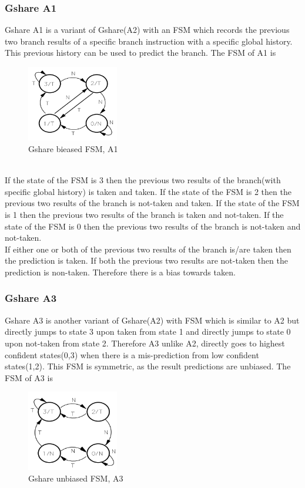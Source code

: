 \documentclass[a4paper]{article}
\begin{document}
        \subsubsection{Gshare A1}
            Gshare A1 is a variant of Gshare(A2) with an FSM which records the previous two branch results of a specific branch instruction with a specific global history. This previous history can be used to predict the branch. The FSM of A1 is \\
            \begin{figure}[ht]
                \centerline{\includegraphics[width= 4cm]{images/veerendra/gshare_a1.png}}
                \caption{Gshare bieased FSM, A1}
                \label{fig_gshare_a1}
            \end{figure}
            \\
            If the state of the FSM is 3 then the previous two results of the branch(with specific global history) is taken and taken. If the state of the FSM is 2 then the previous two results of the branch is not-taken and taken. If the state of the FSM is 1 then the previous two results of the branch is taken and not-taken. If the state of the FSM is 0 then the previous two results of the branch is not-taken and not-taken.\\
            If either one or both of the previous two results of the branch is/are taken then the prediction is taken. If both the previous two results are not-taken then the prediction is non-taken. Therefore there is a bias towards taken.    
        \subsubsection{Gshare A3}
            Gshare A3 is another variant of Gshare(A2) with FSM which is similar to A2 but directly jumps to state 3 upon taken from state 1 and directly jumps to state 0 upon not-taken from state 2. Therefore A3 unlike A2, directly goes to highest confident states(0,3) when there is a mis-prediction from low confident states(1,2). This FSM is symmetric, as the result predictions are unbiased.
            The FSM of A3 is
            \begin{figure}[ht]
                \centerline{\includegraphics[width= 4cm]{images/veerendra/gshare_a3.png}}
                \caption{Gshare unbiased FSM, A3}
                \label{fig_gshare_a3}
            \end{figure}
\end{document}
